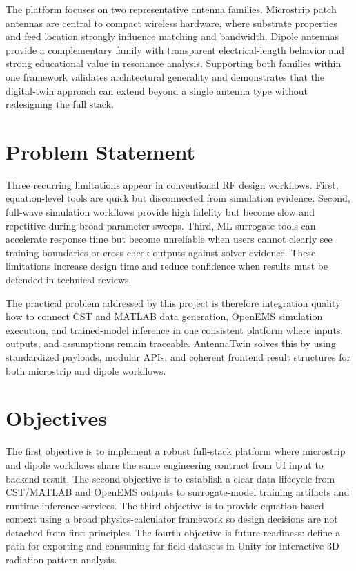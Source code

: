 \documentclass[12pt,a4paper]{article}
\begin{document}
The platform focuses on two representative antenna families. Microstrip patch antennas are central to compact wireless hardware, where substrate properties and feed location strongly influence matching and bandwidth. Dipole antennas provide a complementary family with transparent electrical-length behavior and strong educational value in resonance analysis. Supporting both families within one framework validates architectural generality and demonstrates that the digital-twin approach can extend beyond a single antenna type without redesigning the full stack.

\section{Problem Statement}
Three recurring limitations appear in conventional RF design workflows. First, equation-level tools are quick but disconnected from simulation evidence. Second, full-wave simulation workflows provide high fidelity but become slow and repetitive during broad parameter sweeps. Third, ML surrogate tools can accelerate response time but become unreliable when users cannot clearly see training boundaries or cross-check outputs against solver evidence. These limitations increase design time and reduce confidence when results must be defended in technical reviews.

The practical problem addressed by this project is therefore integration quality: how to connect CST and MATLAB data generation, OpenEMS simulation execution, and trained-model inference in one consistent platform where inputs, outputs, and assumptions remain traceable. AntennaTwin solves this by using standardized payloads, modular APIs, and coherent frontend result structures for both microstrip and dipole workflows.

\section{Objectives}
The first objective is to implement a robust full-stack platform where microstrip and dipole workflows share the same engineering contract from UI input to backend result. The second objective is to establish a clear data lifecycle from CST/MATLAB and OpenEMS outputs to surrogate-model training artifacts and runtime inference services. The third objective is to provide equation-based context using a broad physics-calculator framework so design decisions are not detached from first principles. The fourth objective is future-readiness: define a path for exporting and consuming far-field datasets in Unity for interactive 3D radiation-pattern analysis.
\end{document}
